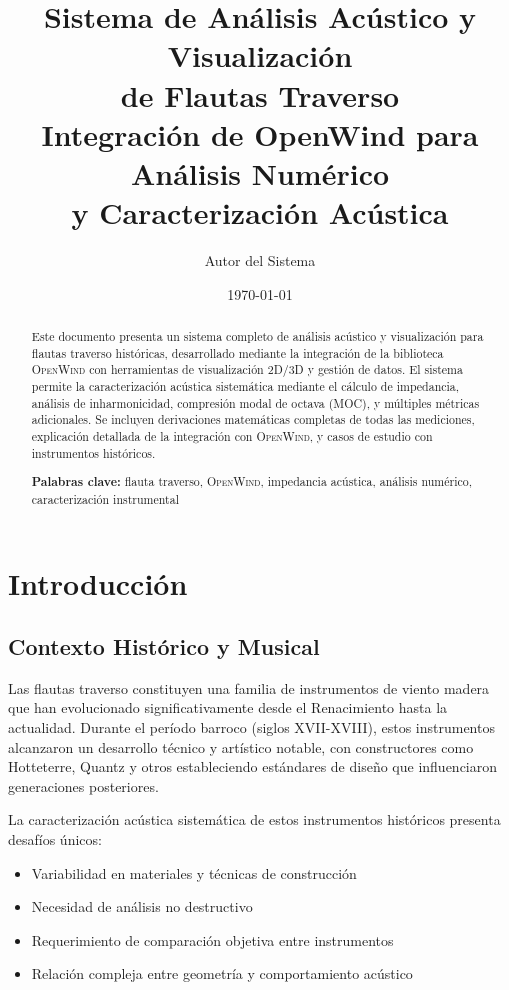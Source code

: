 \documentclass[12pt,a4paper,twocolumn]{article}
\title{\textbf{Sistema de Análisis Acústico y Visualización\\de Flautas Traverso}\\
\large{Integración de OpenWind para Análisis Numérico\\y Caracterización Acústica}}
\author{Autor del Sistema}
\date{\today}
\newcommand{\openwind}{\textsc{OpenWind}}
\begin{document}
\maketitle

\begin{abstract}
Este documento presenta un sistema completo de análisis acústico y visualización para flautas traverso históricas, desarrollado mediante la integración de la biblioteca \openwind{} con herramientas de visualización 2D/3D y gestión de datos. El sistema permite la caracterización acústica sistemática mediante el cálculo de impedancia, análisis de inharmonicidad, compresión modal de octava (MOC), y múltiples métricas adicionales. Se incluyen derivaciones matemáticas completas de todas las mediciones, explicación detallada de la integración con \openwind{}, y casos de estudio con instrumentos históricos.

\vspace{0.3cm}
\textbf{Palabras clave:} flauta traverso, \openwind{}, impedancia acústica, análisis numérico, caracterización instrumental
\end{abstract}

\tableofcontents
\newpage

\section{Introducción}

\subsection{Contexto Histórico y Musical}

Las flautas traverso constituyen una familia de instrumentos de viento madera que han evolucionado significativamente desde el Renacimiento hasta la actualidad. Durante el período barroco (siglos XVII-XVIII), estos instrumentos alcanzaron un desarrollo técnico y artístico notable, con constructores como Hotteterre, Quantz y otros estableciendo estándares de diseño que influenciaron generaciones posteriores.

La caracterización acústica sistemática de estos instrumentos históricos presenta desafíos únicos:
\begin{itemize}
    \item Variabilidad en materiales y técnicas de construcción
    \item Necesidad de análisis no destructivo
    \item Requerimiento de comparación objetiva entre instrumentos
    \item Relación compleja entre geometría y comportamiento acústico
\end{itemize}
\end{document}
